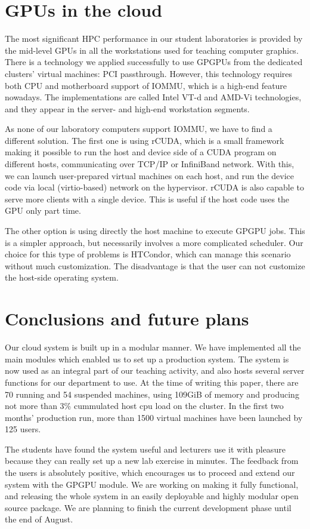\documentclass{llncs}
\begin{document}
\section{GPUs in the cloud}
The most significant HPC performance in our student laboratories is provided by the mid-level GPUs in all the workstations used for teaching computer graphics. There is a technology we applied successfully to use GPGPUs from the dedicated clusters' virtual machines: PCI passthrough.\cite{yang2012implementation} However, this technology requires both CPU and motherboard support of IOMMU, which is a high-end feature nowadays. The implementations are called Intel VT-d and AMD-Vi technologies, and they appear in the server- and high-end workstation segments.

As none of our laboratory computers support IOMMU, we have to find a different solution. The first one is using rCUDA, which is a small framework making it possible to run the host and device side of a CUDA program on different hosts, communicating over TCP/IP or InfiniBand network.\cite{duato2011enabling} With this, we can launch user-prepared virtual machines on each host, and run the device code via local (virtio-based) network on the hypervisor. rCUDA is also capable to serve more clients with a single device. This is useful if the host code uses the GPU only part time.

The other option is using directly the host machine to execute GPGPU jobs. This is a simpler approach, but necessarily involves a more complicated scheduler. Our choice for this type of problems is HTCondor, which can manage this scenario without much customization. The disadvantage is that the user can not customize the host-side operating system.



\section*{Conclusions and future plans}
Our cloud system is built up in a modular manner. We have implemented all the main modules which enabled us to set up a production system. The system is now used as an integral part of our teaching activity, and also hosts several server functions for our department to use. At the time of writing this paper, there are 70 running and 54 suspended machines, using 109GiB of memory and producing not more than 3{\%} cummulated host cpu load on the cluster. In the first two months' production run, more than 1500 virtual machines have been launched by 125 users.

The students have found the system useful and lecturers use it with pleasure because they can really set up a new lab exercise in minutes. The feedback from the users is absolutely positive, which encourages us to proceed and extend our system with the GPGPU module. We are working on making it fully functional, and releasing the whole system in an easily deployable and highly modular open source package. We are planning to finish the current development phase until the end of August. 





\end{document}

